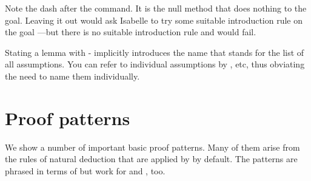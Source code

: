 \begin{isabellebody}
\begin{isamarkuptext}
\begin{warn}
Note the dash after the 
command.  It is the null method that does nothing to the goal. Leaving it out
would ask Isabelle to try some suitable introduction rule on the goal ---but there is no suitable introduction rule and 
would fail.
\end{warn}

Stating a lemma with - implicitly introduces the
name  that stands for the list of all assumptions. You can refer
to individual assumptions by ,  etc,
thus obviating the need to name them individually.

\section{Proof patterns}

We show a number of important basic proof patterns. Many of them arise from
the rules of natural deduction that are applied by  by
default. The patterns are phrased in terms of  but work for
 and , too.


\end{isamarkuptext}
\end{isabellebody}
